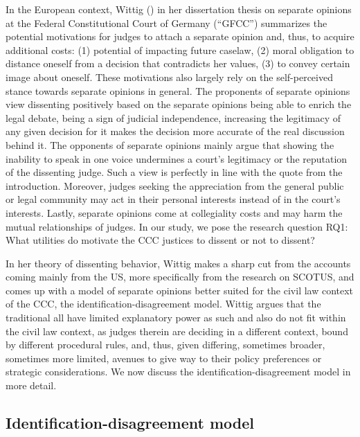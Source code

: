 \documentclass[
  11pt,
]{article}
\begin{document}
In the European context, Wittig () in her dissertation thesis on separate opinions at the Federal Constitutional Court of Germany (``GFCC'') summarizes the potential motivations for judges to attach a separate opinion and, thus, to acquire additional costs: (1) potential of impacting future caselaw, (2) moral obligation to distance oneself from a decision that contradicts her values, (3) to convey certain image about oneself. These motivations also largely rely on the self-perceived stance towards separate opinions in general. The proponents of separate opinions view dissenting positively based on the separate opinions being able to enrich the legal debate, being a sign of judicial independence, increasing the legitimacy of any given decision for it makes the decision more accurate of the real discussion behind it. The opponents of separate opinions mainly argue that showing the inability to speak in one voice undermines a court's legitimacy or the reputation of the dissenting judge. Such a view is perfectly in line with the quote from the introduction. Moreover, judges seeking the appreciation from the general public or legal community may act in their personal interests instead of in the court's interests. Lastly, separate opinions come at collegiality costs and may harm the mutual relationships of judges. In our study, we pose the research question RQ1: What utilities do motivate the CCC justices to dissent or not to dissent?

In her theory of dissenting behavior, Wittig makes a sharp cut from the accounts coming mainly from the US, more specifically from the research on SCOTUS, and comes up with a model of separate opinions better suited for the civil law context of the CCC, the identification-disagreement model. Wittig argues that the traditional all have limited explanatory power as such and also do not fit within the civil law context, as judges therein are deciding in a different context, bound by different procedural rules, and, thus, given differing, sometimes broader, sometimes more limited, avenues to give way to their policy preferences or strategic considerations. We now discuss the identification-disagreement model in more detail.

\subsection{Identification-disagreement model}\label{identification-disagreement}
\end{document}

